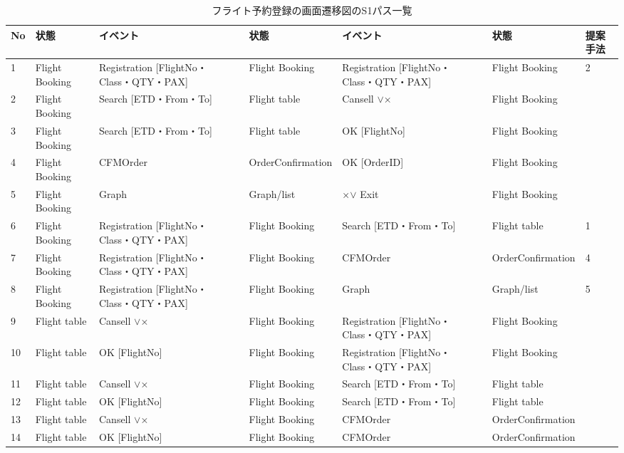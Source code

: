 \begin{table}[t]
\scriptsize
\centering
  \caption{フライト予約登録の画面遷移図のS1パス一覧}
\begin{tabular}{p{1 em}|p{5 em}|p{9.5 em}|p{5 em}|p{9.5 em}|p{5 em}|p{2 em}}
    No    & 状態    & イベント   & 状態    & イベント& 状態 &提案手法\\
\hline
\hline
    1     & Flight Booking  & Registration [FlightNo・Class・QTY・PAX] & Flight Booking  & Registration [FlightNo・Class・QTY・PAX] & Flight Booking  &  2 \\
\hline
    2     & Flight Booking  & Search [ETD・From・To] & Flight table & Cansell $\lor$× & Flight Booking  &  \\
\hline
    3     & Flight Booking  & Search [ETD・From・To] & Flight table & OK [FlightNo] & Flight Booking  &  \\
\hline
    4     & Flight Booking  & CFMOrder & OrderConfirmation & OK [OrderID] & Flight Booking  &  \\
\hline
    5     & Flight Booking  & Graph & Graph/list & ×$\lor$ Exit & Flight Booking  &  \\
\hline
    6     & Flight Booking  & Registration [FlightNo・Class・QTY・PAX] & Flight Booking  & Search [ETD・From・To] & Flight table & 1 \\
\hline
    7     & Flight Booking  & Registration [FlightNo・Class・QTY・PAX] & Flight Booking  & CFMOrder & OrderConfirmation & 4 \\
\hline
    8     & Flight Booking  & Registration [FlightNo・Class・QTY・PAX] & Flight Booking  & Graph & Graph/list & 5 \\
\hline
    9     & Flight table & Cansell $\lor$× & Flight Booking  & Registration [FlightNo・Class・QTY・PAX] & Flight Booking  &  \\
\hline
    10    & Flight table & OK [FlightNo] & Flight Booking  & Registration [FlightNo・Class・QTY・PAX] & Flight Booking  &  \\
\hline
    11    & Flight table & Cansell $\lor$× & Flight Booking  & Search [ETD・From・To] & Flight table &  \\
\hline
    12    & Flight table & OK [FlightNo] & Flight Booking  & Search [ETD・From・To] & Flight table &  \\
\hline
    13    & Flight table & Cansell $\lor$× & Flight Booking  & CFMOrder & OrderConfirmation &  \\
\hline
    14    & Flight table & OK [FlightNo] & Flight Booking  & CFMOrder & OrderConfirmation &  \\

\end{tabular}
\end{table}
